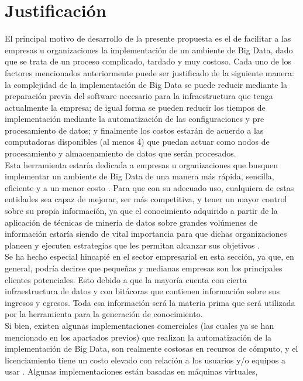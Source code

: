 \section{Justificación}
El principal motivo de desarrollo de la presente propuesta es el de facilitar a las empresas u organizaciones la implementación de
un ambiente de Big Data, dado que se trata de un proceso complicado, tardado y muy costoso. Cada uno de los
factores mencionados anteriormente puede ser justificado de la siguiente manera: la complejidad de la implementación de Big Data
se puede reducir mediante la preparación previa del software necesario para la infraestructura que tenga actualmente la empresa; de
igual forma se pueden reducir los tiempos de implementación mediante la automatización de las configuraciones y pre
procesamiento de datos; y finalmente los costos estarán de acuerdo a las computadoras disponibles (al menos 4) que puedan actuar
como nodos de procesamiento y almacenamiento de datos que serán procesados.
\\
Esta herramienta estaría dedicada a empresas u organizaciones que busquen implementar un ambiente de Big Data de una manera
más rápida, sencilla, eficiente y a un menor costo \cite{refi8}. Para que con su adecuado uso, cualquiera de estas entidades sea capaz de
mejorar, ser más competitiva, y tener un mayor control sobre su propia información, ya que el conocimiento adquirido a partir de
la aplicación de técnicas de minería de datos sobre grandes volúmenes de información estaría siendo de vital importancia para que
dichas organizaciones planeen y ejecuten estrategias que les permitan alcanzar sus objetivos \cite{refi7}.
\\
Se ha hecho especial hincapié en el sector empresarial en esta sección, ya que, en general, podría decirse que pequeñas y medianas
empresas son los principales clientes potenciales. Esto debido a que la mayoría cuenta con cierta infraestructura de datos y con
bitácoras que contienen información sobre sus ingresos y egresos. Toda esa información será la materia prima que será utilizada
por la herramienta para la generación de conocimiento.
\\
Si bien, existen algunas implementaciones comerciales (las cuales ya se han mencionado en los apartados previos) que realizan la
automatización de la implementación de Big Data, son realmente costosas en recursos de cómputo, y el licenciamiento tiene un
costo elevado con relación a los usuarios y/o equipos a usar \cite{refi9}. Algunas implementaciones están basadas en máquinas virtuales,
